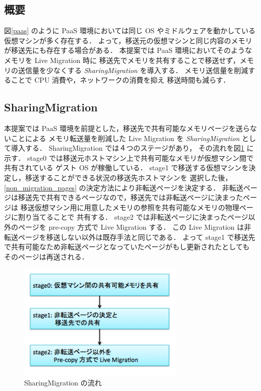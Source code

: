 \documentclass[graduation-thesis]{mlarticle}
\begin{document}
\subsection{概要}
\label{sec-4-1}
図\ref{paas} のように PaaS 環境においては同じ OS やミドルウェアを動かしている
仮想マシンが多く存在する．
よって，移送元の仮想マシンと同じ内容のメモリが移送先にも存在する場合がある．
本提案では PaaS 環境においてそのようなメモリを Live Migration 時に
移送先でメモリを共有することで移送せず，メモリの送信量を少なくする 
{\it SharingMigration}
を導入する．
メモリ送信量を削減することで CPU 消費や，ネットワークの消費を抑え
移送時間も減らす．

\subsection{SharingMigration}
\label{sec-4-2}
本提案では PaaS 環境を前提とした，移送先で共有可能なメモリページを送らないことによる
メモリ転送量を削減した Live Migration を 
{\it SharingMigration}
として導入する．
SharingMigration では４つのステージがあり，
その流れを図\ref{sharing_migration} に示す．
stage0 では移送元ホストマシン上で共有可能なメモリが仮想マシン間で共有されている
ゲスト OS が稼働している．
stage1 で移送する仮想マシンを決定し，移送することができる状況の移送先ホストマシンを
選択した後，\ref{non_migration_pages} の決定方法により非転送ページを決定する．
非転送ページは移送先で共有できるページなので，移送先では非転送ページに決まったページは
移送仮想マシン用に用意したメモリの参照を共有可能なメモリの物理ページに割り当てることで
共有する．
stage2 では非転送ページに決まったページ以外のページを pre-copy 方式で Live Migration する．
この Live Migration は非転送ページを移送しない以外は既存手法と同じである．
よって stage1 で移送先で共有可能なため非転送ページとなっていたページがもし更新されたとしても
そのページは再送される．

\begin{figure}[H]\begin{center}\includegraphics[width=8.0cm]{./img/sharing_migration.png}\caption{ SharingMigration の流れ}\label{sharing_migration}\end{center}\end{figure}
\end{document}
